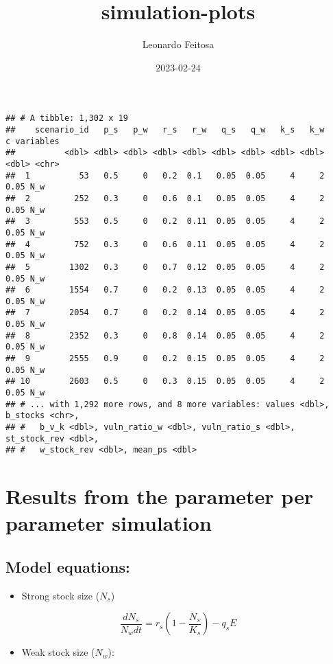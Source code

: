 \documentclass[
]{article}
\title{simulation-plots}
\author{Leonardo Feitosa}
\date{2023-02-24}
\providecommand{\tightlist}{%
  \setlength{\itemsep}{0pt}\setlength{\parskip}{0pt}}
\begin{document}
\maketitle

\begin{verbatim}
## # A tibble: 1,302 x 19
##    scenario_id   p_s   p_w   r_s   r_w   q_s   q_w   k_s   k_w     c variables
##          <dbl> <dbl> <dbl> <dbl> <dbl> <dbl> <dbl> <dbl> <dbl> <dbl> <chr>    
##  1          53   0.5     0   0.2  0.1   0.05  0.05     4     2  0.05 N_w      
##  2         252   0.3     0   0.6  0.1   0.05  0.05     4     2  0.05 N_w      
##  3         553   0.5     0   0.2  0.11  0.05  0.05     4     2  0.05 N_w      
##  4         752   0.3     0   0.6  0.11  0.05  0.05     4     2  0.05 N_w      
##  5        1302   0.3     0   0.7  0.12  0.05  0.05     4     2  0.05 N_w      
##  6        1554   0.7     0   0.2  0.13  0.05  0.05     4     2  0.05 N_w      
##  7        2054   0.7     0   0.2  0.14  0.05  0.05     4     2  0.05 N_w      
##  8        2352   0.3     0   0.8  0.14  0.05  0.05     4     2  0.05 N_w      
##  9        2555   0.9     0   0.2  0.15  0.05  0.05     4     2  0.05 N_w      
## 10        2603   0.5     0   0.3  0.15  0.05  0.05     4     2  0.05 N_w      
## # ... with 1,292 more rows, and 8 more variables: values <dbl>, b_stocks <chr>,
## #   b_v_k <dbl>, vuln_ratio_w <dbl>, vuln_ratio_s <dbl>, st_stock_rev <dbl>,
## #   w_stock_rev <dbl>, mean_ps <dbl>
\end{verbatim}

\hypertarget{results-from-the-parameter-per-parameter-simulation}{%
\section{Results from the parameter per parameter
simulation}\label{results-from-the-parameter-per-parameter-simulation}}

\hypertarget{model-equations}{%
\subsection{Model equations:}\label{model-equations}}

\begin{itemize}
\tightlist
\item
  Strong stock size (\(N_s\))
\end{itemize}

\[
\frac{dN_s}{N_wdt} = r_s (1 - \frac{N_s}{K_s}) - q_s E
\]

\begin{itemize}
\tightlist
\item
  Weak stock size (\(N_w\)):
\end{itemize}
\end{document}
